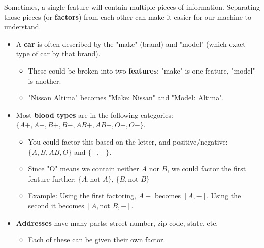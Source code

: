                 Sometimes, a single feature will contain multiple pieces of information. Separating those pieces (or \textbf{factors}) from each other can make it easier for our machine to understand.

                \begin{itemize}
                    \item A \textbf{car} is often described by the "make" (brand) and "model" (which exact type of car by that brand). 
                        \begin{itemize}
                            \item These could be broken into two \textbf{features}: "make" is one feature, "model" is another.
                            \item \miniex "Nissan Altima" becomes "Make: Nissan" and "Model: Altima".
                        \end{itemize}
                        
                    \item Most \textbf{blood types} are in the following categories: $\{A+, A-, B+, B-, AB+, AB-, O+, O-\}$. 
                    \begin{itemize}
                        \item You could factor this based on the letter, and positive/negative: $\{A,B,AB,O\}$ and $\{+,-\}$.
                        \item Since "O" means we contain neither $A$ nor $B$, we could factor the first feature further: $\{A, \text{not } A\}$, $\{B, \text{not } B\}$
                        \item Example: Using the first factoring, $A-$ becomes $[A, -]$. Using the second it becomes $[A, \text{not } B, -]$. 
                    \end{itemize}

                    \item \textbf{Addresses} have many parts: street number, zip code, state, etc.
                        \begin{itemize}
                            \item Each of these can be given their own factor.\\
                        \end{itemize}
                \end{itemize}

